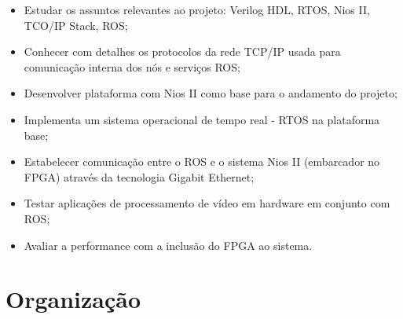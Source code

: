 \begin{itemize}
    \item Estudar os assuntos relevantes ao projeto: Verilog HDL, RTOS, Nios II, TCO/IP Stack, ROS;
    \item Conhecer com detalhes os protocolos da rede TCP/IP usada para comunicação interna dos nós e serviços ROS;
    \item Desenvolver plataforma com Nios II como base para o andamento do projeto;
    \item Implementa um sistema operacional de tempo real - RTOS na plataforma base;
    \item Estabelecer comunicação entre o ROS e o sistema Nios II (embarcador no FPGA) através da tecnologia Gigabit Ethernet;
    \item Testar aplicações de processamento de vídeo em hardware em conjunto com ROS;
    \item Avaliar a performance com a inclusão do FPGA ao sistema.
\end{itemize}


\section{Organização}